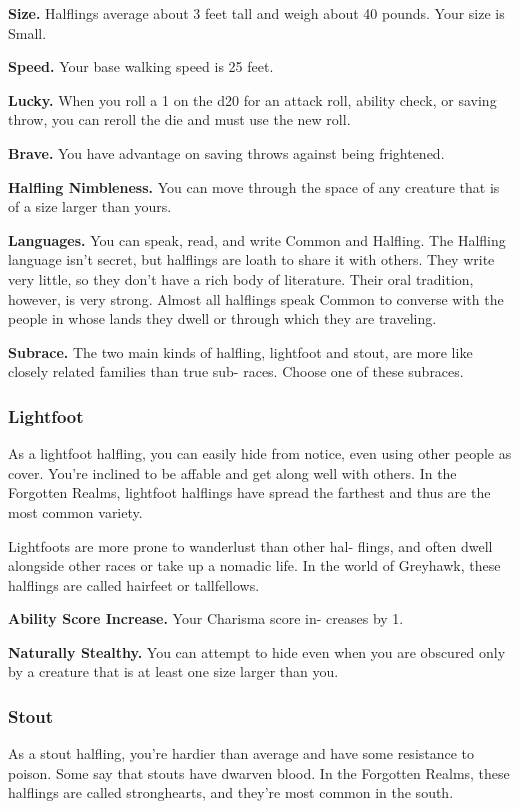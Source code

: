 \textbf{Size.} Halflings average about 3 feet tall and weigh about 40 pounds. Your size is Small.

\textbf{Speed.} Your base walking speed is 25 feet.

\textbf{Lucky.} When you roll a 1 on the d20 for an attack roll, ability check, or saving throw, you can reroll the die and must use the new roll.

\textbf{Brave.} You have advantage on saving throws against being frightened.

\textbf{Halfling Nimbleness.} You can move through the space of any creature that is of a size larger than yours.

\textbf{Languages.} You can speak, read, and write Common and Halfling. The Halfling language isn’t secret, but halflings are loath to share it with others. They write very little, so they don’t have a rich body of literature. Their oral tradition, however, is very strong. Almost all halflings speak Common to converse with the people in whose lands they dwell or through which they are traveling.

\textbf{Subrace.} The two main kinds of halfling, lightfoot and stout, are more like closely related families than true sub- races. Choose one of these subraces.

\subsubsection{Lightfoot}
As a lightfoot halfling, you can easily hide from notice, even using other people as cover. You’re inclined to be affable and get along well with others. In the Forgotten Realms, lightfoot halflings have spread the farthest and thus are the most common variety.

Lightfoots are more prone to wanderlust than other hal- flings, and often dwell alongside other races or take up a nomadic life. In the world of Greyhawk, these halflings are called hairfeet or tallfellows.

\textbf{Ability Score Increase.} Your Charisma score in- creases by 1.

\textbf{Naturally Stealthy.} You can attempt to hide even when you are obscured only by a creature that is at least one size larger than you.

\subsubsection{Stout}
As a stout halfling, you’re hardier than average and have some resistance to poison. Some say that stouts have dwarven blood. In the Forgotten Realms, these halflings are called stronghearts, and they’re most common in the south.

